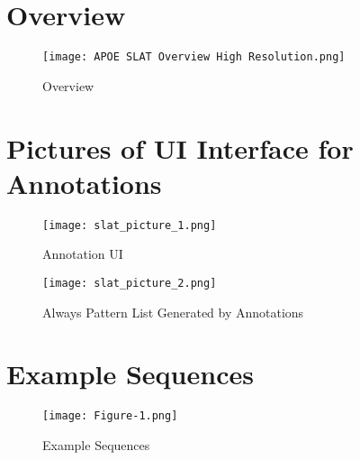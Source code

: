 \documentclass[pmlr,twocolumn,10pt]{jmlr} %
\begin{document}
\appendix

\section{Overview}
\begin{figure}[h] \label{app:overview}
\centering 
\texttt{[image: APOE SLAT Overview High Resolution.png]}
\caption{Overview}

\end{figure}

\clearpage

\section{Pictures of UI Interface for Annotations} 
\label{app:slat}
\begin{figure}[h]
\centering 
\texttt{[image: slat\_picture\_1.png]}
\caption{Annotation UI}
\end{figure}

\begin{figure}[h]
\centering 
\texttt{[image: slat\_picture\_2.png]}
\caption{Always Pattern List Generated by Annotations}
\end{figure}

\clearpage

\section{Example Sequences} 
\begin{figure}[h!] \label{app:examples}
\centering 
\texttt{[image: Figure-1.png]}
\caption{Example Sequences}
\end{figure}

\clearpage

\end{document}

